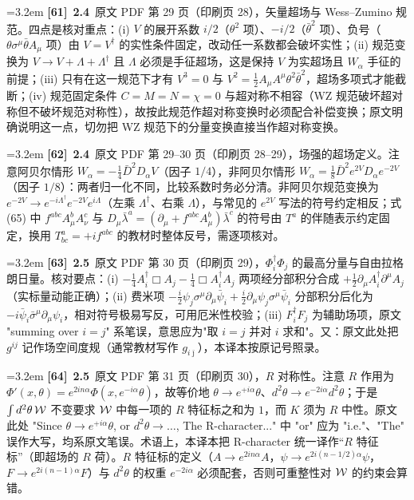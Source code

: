 \par
\par\medskip\noindent\hangindent=3.2em \textbf{[61]}~\textbf{2.4}~原文 PDF 第 29 页（印刷页 28），矢量超场与 Wess--Zumino 规范。四点是核对重点：(i) $V$ 的展开系数 $i/2$（$\theta^2$ 项）、$-i/2$（$\bar\theta^2$ 项）、负号（$\theta\sigma^\mu\bar\theta A_\mu$ 项）由 $V=V^\dagger$ 的实性条件固定，改动任一系数都会破坏实性；(ii) 规范变换为 $V\to V+\Lambda+\Lambda^\dagger$ 且 $\Lambda$ 必须是手征超场，这是保持 $V$ 为实超场且 $W_\alpha$ 手征的前提；(iii) 只有在这一规范下才有 $V^3=0$ 与 $V^2=\frac12A_\mu A^\mu\theta^2\bar\theta^2$，超场多项式才能截断；(iv) 规范固定条件 $C=M=N=\chi=0$ 与超对称不相容（WZ 规范破坏超对称但不破坏规范对称性），故按此规范作超对称变换时必须配合补偿变换；原文明确说明这一点，切勿把 WZ 规范下的分量变换直接当作超对称变换。
\par
\par\medskip\noindent\hangindent=3.2em \textbf{[62]}~\textbf{2.4}~原文 PDF 第 29--30 页（印刷页 28--29），场强的超场定义。注意阿贝尔情形 $W_\alpha=-\frac14\bar D^2D_\alpha V$（因子 $1/4$），非阿贝尔情形 $W_\alpha=\frac18\bar D^2 e^{2V}D_\alpha e^{-2V}$（因子 $1/8$）：两者归一化不同，比较系数时务必分清。非阿贝尔规范变换为 $e^{-2V}\to e^{-i\Lambda^\dagger}e^{-2V}e^{i\Lambda}$（左乘 $\Lambda^\dagger$、右乘 $\Lambda$），与常见的 $e^{2V}$ 写法的符号约定相反；式 (65) 中 $f^{abc}A^b_\mu A^c_\nu$ 与 $D_\mu\bar\lambda^a=(\partial_\mu+f^{abc}A^b_\mu)\bar\lambda^c$ 的符号由 $T^a$ 的伴随表示约定固定，换用 $T^a_{bc}=+if^{abc}$ 的教材时整体反号，需逐项核对。
\par
\par\medskip\noindent\hangindent=3.2em \textbf{[63]}~\textbf{2.5}~原文 PDF 第 30 页（印刷页 29），$\Phi_i^\dagger\Phi_j$ 的最高分量与自由拉格朗日量。核对要点：(i) $-\frac14A_i^\dagger\Box A_j-\frac14\Box A_i^\dagger A_j$ 两项经分部积分合成 $+\frac12\partial_\mu A_i^\dagger\partial^\mu A_j$（实标量动能正确）；(ii) 费米项 $-\frac i2\psi_j\sigma^\mu\partial_\mu\bar\psi_i+\frac i2\partial_\mu\psi_j\sigma^\mu\bar\psi_i$ 分部积分后化为 $-i\bar\psi_i\bar\sigma^\mu\partial_\mu\psi_i$，相对符号极易写反，可用厄米性校验；(iii) $F_i^\dagger F_j$ 为辅助场项，原文 "summing over $i=j$" 系笔误，意思应为"取 $i=j$ 并对 $i$ 求和"。又：原文此处把 $g^{ij}$ 记作场空间度规（通常教材写作 $g_{i\bar\jmath}$），本译本按原记号照录。
\par
\par\medskip\noindent\hangindent=3.2em \textbf{[64]}~\textbf{2.5}~原文 PDF 第 31 页（印刷页 30），$R$ 对称性。注意 $R$ 作用为 $\Phi'(x,\theta)=e^{2in\alpha}\Phi(x,e^{-i\alpha}\theta)$，故等价地 $\theta\to e^{+i\alpha}\theta$、$d^2\theta\to e^{-2i\alpha}d^2\theta$；于是 $\int d^2\theta\,{\cal W}$ 不变要求 ${\cal W}$ 中每一项的 $R$ 特征标之和为 $1$，而 $K$ 须为 $R$ 中性。原文此处 "Since $\theta\to e^{+i\alpha}\theta$, or $d^2\theta\to\ldots$, The R-character..." 中 "or" 应为 "i.e."、"The" 误作大写，均系原文笔误。术语上，本译本把 R-character 统一译作“$R$ 特征标”（即超场的 $R$ 荷）。$R$ 特征标的定义（$A\to e^{2in\alpha}A$，$\psi\to e^{2i(n-1/2)\alpha}\psi$，$F\to e^{2i(n-1)\alpha}F$）与 $d^2\theta$ 的权重 $e^{-2i\alpha}$ 必须配套，否则可重整性对 ${\cal W}$ 的约束会算错。
